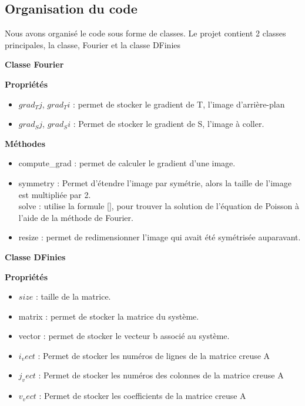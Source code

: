 \subsection{Organisation du code}
Nous avons organisé le code sous forme de classes. Le projet contient 2 classes principales, la classe, Fourier et la classe DFinies

\begin{center}
\textbf{Classe Fourier}\\
\end{center}
\textbf{Propriétés}\\
\begin{itemize}
\item $grad_Tj$, $grad_Ti$ : permet de stocker le gradient de T, l'image d'arrière-plan\\
\item $grad_Sj$, $grad_Si$  : Permet de stocker le gradient de S, l'image à coller. \\
\end{itemize}
\textbf{Méthodes}
\begin{itemize}
\item compute\_grad : permet de calculer le gradient d'une image.
\item symmetry : Permet d'étendre l'image par symétrie, alors la taille de l'image est multipliée par 2. \\ 
solve : utilise la formule [], pour trouver la solution de l'équation de Poisson à l'aide de la méthode de Fourier. 
\item resize : permet de redimensionner l'image qui avait été symétrisée auparavant.
\end{itemize}
\begin{center}
\textbf{Classe DFinies}\\
\end{center}
\textbf{Propriétés}\\
\begin{itemize}
\item $size$ : taille de la matrice.
\item matrix : permet de stocker la matrice du système.
\item vector : permet de stocker le vecteur b associé au système.
\item $i_vect$ : Permet de stocker les numéros de lignes de la matrice creuse A
\item $j_vect$ : Permet de stocker les numéros des colonnes de la matrice creuse A
\item $v_vect$ : Permet de stocker les coefficients de la matrice creuse A
\end{itemize}
